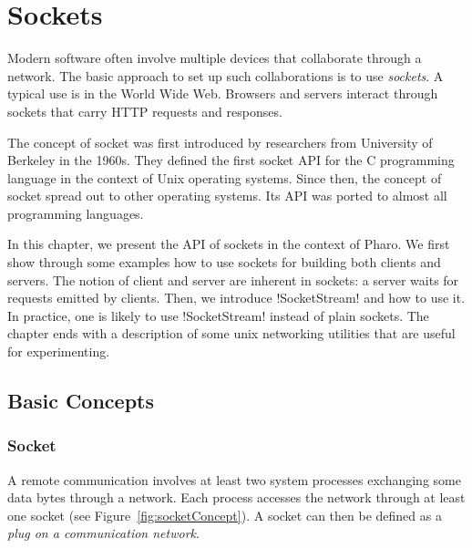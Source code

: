 \documentclass[a4paper,10pt,twoside]{book}
\begin{document}
	\sloppy
\fi
\newcommand{\noury}[1]{\nnbb{Noury}{#1}}


\chapter{Sockets}\label{cha:sockets}

\chapterwritten{\authornoury \\ \authorluc}

Modern software often involve multiple devices that collaborate through a network.
The basic approach to set up such collaborations is to use \textit{sockets}. A typical use is in the World Wide Web. Browsers and servers interact through sockets that carry HTTP requests and responses.

The concept of socket was first introduced by researchers from  University of Berkeley in the 1960s. They defined the first socket API for the C programming language in the context of Unix operating systems. Since then, the concept of socket spread out to other operating systems. Its API was ported to almost all programming languages.

In this chapter, we present the API of sockets in the context of Pharo.
We first show through some examples how to use sockets for building both clients and servers. The notion of client and server are inherent in sockets: a server waits for requests emitted by clients.
Then, we introduce \ct!SocketStream! and how to use it.
In practice, one is likely to use \ct!SocketStream! instead of plain sockets.
The chapter ends with a description of some unix networking utilities that are useful for experimenting.

\section{Basic Concepts}
\subsection{Socket}
A remote communication involves at least two system processes exchanging some data bytes through a network. Each process accesses the network through at least one socket (see Figure~\ref{fig:socketConcept}).
A socket can then be defined as a \textit{plug on a communication network}.
\end{document}
